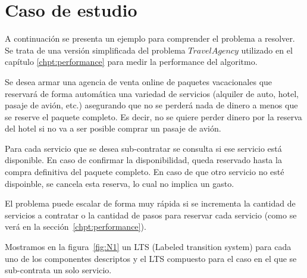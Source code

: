 
\section{Caso de estudio}\label{chpt:casoAviones}
A continuación se presenta un ejemplo para comprender el problema a resolver. Se trata de una versión simplificada del problema $Travel Agency$ utilizado en el capítulo \ref{chpt:performance} para medir la performance del algoritmo.

Se desea armar una agencia de venta online de paquetes vacacionales que reservará de forma automática una variedad de servicios (alquiler de auto, hotel, pasaje de avión, etc.) asegurando que no se perderá nada de dinero a menos que se reserve el paquete completo. Es decir, no se quiere perder dinero por la reserva del hotel si no va a ser posible comprar un pasaje de avión.

Para cada servicio que se desea sub-contratar se consulta si ese servicio está disponible. En caso de confirmar la disponibilidad, queda reservado hasta la compra definitiva del paquete completo. En caso de que otro servicio no esté dispoinble, se cancela esta reserva, lo cual no implica un gasto.

El problema puede escalar de forma muy rápida si se incrementa la cantidad de servicios a contratar o la cantidad de pasos para reservar cada servicio (como se verá en la sección~\ref{chpt:performance}).

Mostramos en la figura~\ref{fig:N1} un LTS (Labeled transition system) para cada uno de los componentes descriptos y el LTS compuesto para el caso en el que se sub-contrata un solo servicio.

